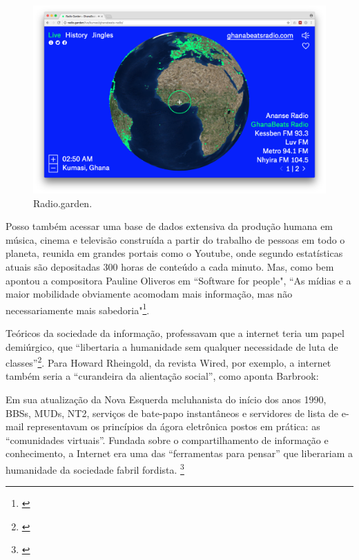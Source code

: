 \begin{figure}[htb]
    \caption{\label{radiogarden} Radio.garden.}
    \begin{center}
        \includegraphics[width=1\linewidth]{pictures/radio_garden_2018-06-10.png}
    \end{center}
    
\end{figure}

Posso também acessar uma base de dados extensiva da produção humana em música, cinema e televisão construída a partir do trabalho de pessoas em todo o planeta, reunida em grandes portais como o Youtube, onde segundo estatísticas atuais são depositadas 300 horas de conteúdo a cada minuto. Mas, como bem apontou a compositora Pauline Oliveros em ``Software for people", ``As mídias e a maior mobilidade obviamente acomodam mais informação, mas não necessariamente mais sabedoria"\footnote{\cite[179]{Oliveros2012}}. 

Teóricos da sociedade da informação, professavam que a internet teria um papel demiúrgico, que ``libertaria a humanidade sem qualquer necessidade de luta de classes''\footnote{\cite[275]{Barbrook2009}}. Para Howard Rheingold, da revista Wired, por exemplo, a internet também seria a ``curandeira da alientação social'', como aponta Barbrook:


\begin{citacao}
Em sua atualização da Nova Esquerda mcluhanista do início dos anos 1990, BBSs, MUDs, NT2, serviços de bate-papo instantâneos e servidores de lista de e-mail representavam os princípios da ágora eletrônica postos em prática: as “comunidades virtuais”. Fundada sobre o compartilhamento de informação e conhecimento, a Internet era uma das “ferramentas para pensar” que liberariam a humanidade da sociedade fabril fordista. \footnote{\cite[350]{Barbrook2009}}
\end{citacao}

